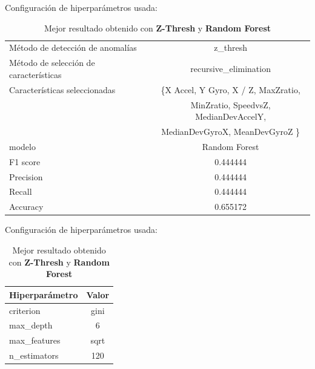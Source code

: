 \begin{appendices}
\begin{table}[htb]
		\end{table}
		Configuración de hiperparámetros usada:
		\begin{table}[htb]
			\centering
			\caption{Mejor resultado obtenido con \textbf{Z-Thresh} y \textbf{Random Forest}}
			\label{table:33}
			\begin{tabular}{lc}
				\toprule
				\midrule
					  Método de detección de anomalías &                                           z\_thresh \\
				Método de selección de características &                              recursive\_elimination \\
						 Características seleccionadas & \{X Accel, Y Gyro, X / Z, MaxZratio, \\ 
						                               & MinZratio,  SpeedvsZ, MedianDevAccelY,  \\
													   &  MedianDevGyroX, MeanDevGyroZ \}\\
												modelo &                                      Random Forest \\
											  F1 score &                                           0.444444 \\
											 Precision &                                           0.444444 \\
												Recall &                                           0.444444 \\
											  Accuracy &                                           0.655172 \\
				\bottomrule
			\end{tabular}
			\newline
			\newline
			Configuración de hiperparámetros usada:
			\begin{tabular}{lc}
				\toprule
				Hiperparámetro & Valor \\
				\midrule
					 criterion &  gini \\
					 max\_depth &     6 \\
				  max\_features &  sqrt \\
				  n\_estimators &   120 \\
				\bottomrule
			\end{tabular}
			
		\end{table}
		

\end{appendices}
